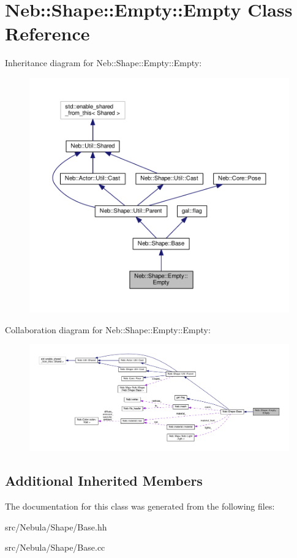 \hypertarget{classNeb_1_1Shape_1_1Empty_1_1Empty}{\section{Neb\-:\-:Shape\-:\-:Empty\-:\-:Empty Class Reference}
\label{classNeb_1_1Shape_1_1Empty_1_1Empty}
}


Inheritance diagram for Neb\-:\-:Shape\-:\-:Empty\-:\-:Empty\-:
\nopagebreak
\begin{figure}[H]
\begin{center}
\leavevmode
\includegraphics[width=350pt]{classNeb_1_1Shape_1_1Empty_1_1Empty__inherit__graph}
\end{center}
\end{figure}


Collaboration diagram for Neb\-:\-:Shape\-:\-:Empty\-:\-:Empty\-:
\nopagebreak
\begin{figure}[H]
\begin{center}
\leavevmode
\includegraphics[width=350pt]{classNeb_1_1Shape_1_1Empty_1_1Empty__coll__graph}
\end{center}
\end{figure}
\subsection*{Additional Inherited Members}


The documentation for this class was generated from the following files\-:\begin{DoxyCompactItemize}
\item 
src/\-Nebula/\-Shape/Base.\-hh\item 
src/\-Nebula/\-Shape/Base.\-cc\end{DoxyCompactItemize}
